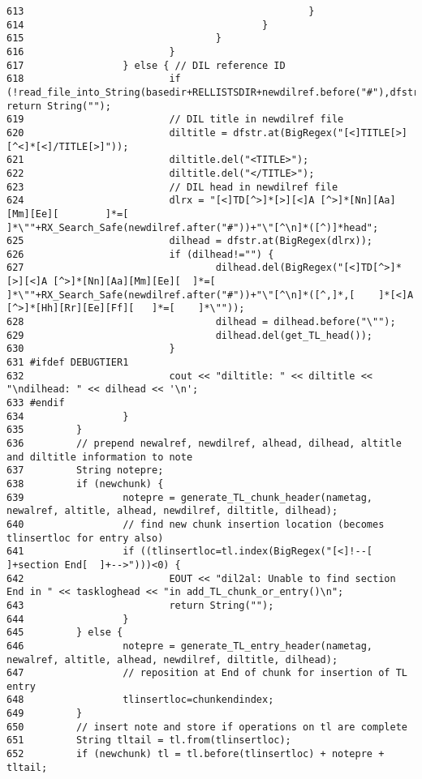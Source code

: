\begin{verbatim}
613                                                 }
614                                         }
615                                 }
616                         }
617                 } else { // DIL reference ID
618                         if (!read_file_into_String(basedir+RELLISTSDIR+newdilref.before("#"),dfstr)) return String("");
619                         // DIL title in newdilref file
620                         diltitle = dfstr.at(BigRegex("[<]TITLE[>][^<]*[<]/TITLE[>]"));
621                         diltitle.del("<TITLE>");
622                         diltitle.del("</TITLE>");
623                         // DIL head in newdilref file
624                         dlrx = "[<]TD[^>]*[>][<]A [^>]*[Nn][Aa][Mm][Ee][        ]*=[    ]*\""+RX_Search_Safe(newdilref.after("#"))+"\"[^\n]*([^)]*head";
625                         dilhead = dfstr.at(BigRegex(dlrx));
626                         if (dilhead!="") {
627                                 dilhead.del(BigRegex("[<]TD[^>]*[>][<]A [^>]*[Nn][Aa][Mm][Ee][  ]*=[    ]*\""+RX_Search_Safe(newdilref.after("#"))+"\"[^\n]*([^,]*,[    ]*[<]A [^>]*[Hh][Rr][Ee][Ff][   ]*=[    ]*\""));
628                                 dilhead = dilhead.before("\"");
629                                 dilhead.del(get_TL_head());
630                         }
631 #ifdef DEBUGTIER1
632                         cout << "diltitle: " << diltitle << "\ndilhead: " << dilhead << '\n';
633 #endif
634                 }
635         }
636         // prepend newalref, newdilref, alhead, dilhead, altitle and diltitle information to note
637         String notepre;
638         if (newchunk) {
639                 notepre = generate_TL_chunk_header(nametag, newalref, altitle, alhead, newdilref, diltitle, dilhead);
640                 // find new chunk insertion location (becomes tlinsertloc for entry also)
641                 if ((tlinsertloc=tl.index(BigRegex("[<]!--[     ]+section End[  ]+-->")))<0) {
642                         EOUT << "dil2al: Unable to find section End in " << taskloghead << "in add_TL_chunk_or_entry()\n";
643                         return String("");
644                 }
645         } else {
646                 notepre = generate_TL_entry_header(nametag, newalref, altitle, alhead, newdilref, diltitle, dilhead);
647                 // reposition at End of chunk for insertion of TL entry
648                 tlinsertloc=chunkendindex;
649         }
650         // insert note and store if operations on tl are complete
651         String tltail = tl.from(tlinsertloc);
652         if (newchunk) tl = tl.before(tlinsertloc) + notepre + tltail;

\end{verbatim}
